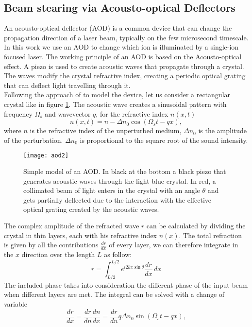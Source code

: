 \subsection{Beam stearing via Acousto-optical Deflectors}
\label{theory_AOD}
An acousto-optical deflector (AOD) is a common device that can change the propagation direction of a laser beam, typically on the few microsecond timescale. In this work we use an AOD to change which ion is illuminated by a single-ion focused laser. The working principle of an AOD is based on the Acousto-optical effect. A piezo is used to create acoustic waves that propagate through a crystal. The waves modify the crystal refractive index, creating a periodic optical grating that can deflect light travelling through it.  \\
Following the approach of \cite{saleh} to model the device, let us consider a rectangular crystal like in figure \ref{AOD}. The acoustic wave creates a sinusoidal pattern with frequency $\Omega_s$ and wavevector $q$, for the refractive index $n(x,t)$
\begin{equation}
n(x,t) = n - \Delta n_0 \cos \left(\Omega_s t - qx \right),
\end{equation}
where $n$ is the refractive index of the unperturbed medium, $\Delta n_0$ is the amplitude of the perturbation. $\Delta n_0$ is proportional to the square root of the sound intensity.
\begin{figure}
\centering
\texttt{[image: aod2]}
\caption{Simple model of an AOD. In black at the bottom a black piezo that generates acoustic waves through the light blue crystal. In red, a collimated beam of light enters in the crystal with an angle $\theta$ and gets partially deflected due to the interaction with the effective optical grating created by the acoustic waves.}
\label{AOD}
\end{figure}
The complex amplitude of the refracted wave $r$ can be calculated by dividing the crystal in thin layers, each with his refractive index $n(x)$. The total refraction is given by all the contributions $\frac{dr}{dx}$ of every layer, we can therefore integrate in the $x$ direction over the length $L$ as follow:
\begin{equation}
r = \int_{L/2}^{L/2} e^{i2kx \sin\theta} \frac{dr}{dx} \,dx
\end{equation}
The included phase takes into consideration the different phase of the input beam when different layers are met. The integral can be solved with a change of variable
\begin{equation}
\frac{dr}{dx} = \frac{dr}{dn}\frac{dn}{dx} = \frac{dr}{dn} q \Delta n_0 \sin \left(\Omega_s t - qx \right),
\end{equation}
